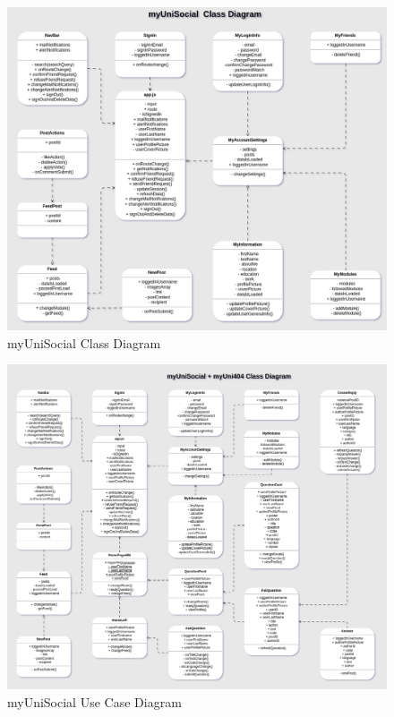 \documentclass[lettersize,journal]{IEEEtran}
\begin{document}
	\begin{figure}[h!]
                \includegraphics[width=0.85\paperwidth]{images/myUniSocialClass.png}
                \caption{myUniSocial Class Diagram}
                \label{figure 3}
\end{figure}
\begin{figure}[h!]
                \includegraphics[width=0.85\paperwidth]{images/myUniSocial404Class.png}
                \caption{myUniSocial Use Case Diagram}
                \label{figure 4}
\end{figure}
\end{document}
